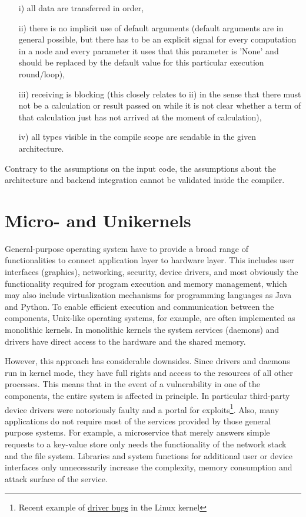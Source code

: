 \begin{itemize}
    \item[i)] all data are transferred in order,
    \item[ii)] there is no implicit use of default arguments (default arguments are in general possible, but there has to be an explicit signal for every computation in a node and every parameter it uses that this parameter is 'None' and should be replaced by the default value for this particular execution round/loop),
    \item[iii)] receiving is blocking (this closely relates to ii) in the sense that there must not be a calculation or result passed on while it is not clear whether a term of that calculation just has not arrived at the moment of calculation),
    \item[iv)] all types visible in the compile scope are sendable in the given architecture.
\end{itemize}

Contrary to the assumptions on the input code, the assumptions about the architecture and backend integration cannot be validated inside the compiler. 
    
\section{Micro- and Unikernels}

General-purpose operating system have to provide a broad range of functionalities to connect application layer to hardware layer. This includes user interfaces (graphics), networking, security, device drivers, and most obviously the functionality required for program execution and memory management, which may also include virtualization mechanisms for programming languages as Java and Python. To enable efficient execution and communication between the components, Unix-like operating systems, for example, are often implemented as monolithic kernels. In monolithic kernels the system services (daemons) and drivers have direct access to the hardware and the shared memory. 

However, this approach has considerable downsides. Since drivers and daemons run in kernel mode, they have full rights and access to the resources of all other processes. This means that in the event of a vulnerability in one of the components, the entire system is affected in principle. In particular third-party device drivers were notoriously faulty and a portal for exploits\footnote{Recent example of \href{https://nakedsecurity.sophos.com/2021/03/17/serious-security-the-linux-kernel-bugs-that-surfaced-after-15-years/}{driver bugs} in the Linux kernel }. Also, many applications do not require most of the services provided by those general purpose systems. For example, a microservice that merely answers simple requests to a key-value store only needs the functionality of the network stack and the file system. Libraries and system functions for additional user or device interfaces only unnecessarily increase the complexity, memory consumption and attack surface of the service. \\

